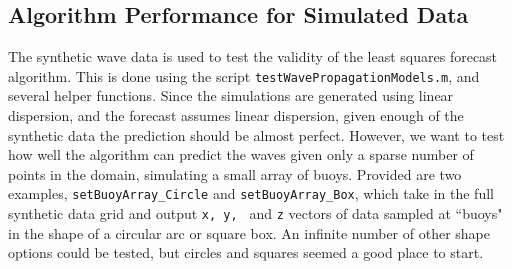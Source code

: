 \documentclass[11pt]{article}
\begin{document}
\subsection{Algorithm Performance for Simulated Data}
The synthetic wave data is used to test the validity of the least squares forecast algorithm.  This is done using the script \texttt{testWavePropagationModels.m}, and several helper functions.  Since the simulations are generated using linear dispersion, and the forecast assumes linear dispersion, given enough of the synthetic data the prediction should be almost perfect.  However, we want to test how well the algorithm can predict the waves given only a sparse number of points in the domain, simulating a small array of buoys.  Provided are two examples, \texttt{setBuoyArray\_Circle} and \texttt{setBuoyArray\_Box}, which take in the full synthetic data grid and output \texttt{x, y, } and \texttt{z} vectors of data sampled at ``buoys" in the shape of a circular arc or square box.  An infinite number of other shape options could be tested, but circles and squares seemed a good place to start.
\end{document}
